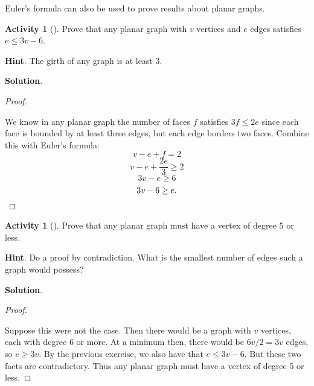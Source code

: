 \documentclass[10pt,]{book}
\theoremstyle{plain}
\theoremstyle{definition}
\theoremstyle{definition}
\theoremstyle{definition}
\newtheorem{activity}[project]{Activity}
\numberwithin{equation}{chapter}
\begin{document}
\par
\hypertarget{p-291}{}%
Euler's formula can also be used to prove results about planar graphs.%
\begin{activity}[]\label{activity-25}
\hypertarget{p-292}{}%
Prove that any planar graph with \(v\) vertices and \(e\) edges satisfies \(e \le 3v - 6\).%
\par\smallskip%
\noindent\textbf{Hint}.\hypertarget{hint-9}{}\quad%
\hypertarget{p-293}{}%
The girth of any graph is at least 3.%
\par\smallskip%
\noindent\textbf{Solution}.\hypertarget{solution-14}{}\quad%
\begin{proof}\hypertarget{proof-3}{}
\hypertarget{p-294}{}%
We know in any planar graph the number of faces \(f\) satisfies \(3f \le 2e\) since each face is bounded by at least three edges, but each edge borders two faces. Combine this with Euler's formula:%
\begin{equation*}
v - e + f = 2
\end{equation*}
%
\begin{equation*}
v - e + \frac{2e}{3} \ge 2
\end{equation*}
%
\begin{equation*}
3v - e \ge 6
\end{equation*}
%
\begin{equation*}
3v - 6 \ge e.\qedhere
\end{equation*}
%
\end{proof}
\end{activity}
\begin{activity}[]\label{act-planardeg5}
\hypertarget{p-295}{}%
Prove that any planar graph must have a vertex of degree 5 or less.%
\par\smallskip%
\noindent\textbf{Hint}.\hypertarget{hint-10}{}\quad%
\hypertarget{p-296}{}%
Do a proof by contradiction.  What is the smallest number of edges such a graph would possess?%
\par\smallskip%
\noindent\textbf{Solution}.\hypertarget{solution-15}{}\quad%
\begin{proof}\hypertarget{proof-4}{}
\hypertarget{p-297}{}%
Suppose this were not the case. Then there would be a graph with \(v\) vertices, each with degree 6 or more. At a minimum then, there would be \(6v/2 = 3v\) edges, so \(e \ge 3v\). By the previous exercise, we also have that \(e \le 3v - 6\). But these two facts are contradictory. Thus any planar graph must have a vertex of degree 5 or less.%
\end{proof}
\end{activity}
\typeout{************************************************}
\typeout{************************************************}
\end{document}
